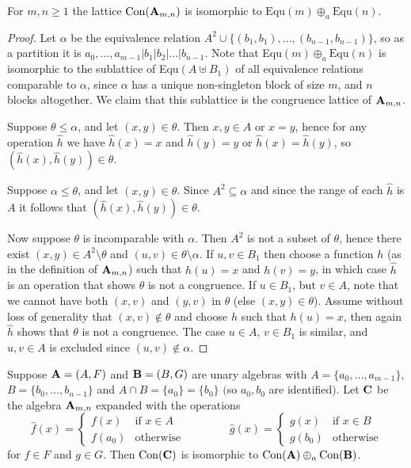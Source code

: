 \begin{lemma}
  For $m,n\ge 1$ the lattice $\mathrm{Con}(\mathbf A_{m,n})$ is isomorphic to
  $\mathrm{Equ}(m)\oplus_a \mathrm{Equ}(n)$. 
\end{lemma}
\begin{proof}
  Let $\alpha$ be the equivalence relation
  $A^2\cup\{(b_1,b_1),\dots,(b_{n-1},b_{n-1})\}$, so as a partition it is  
  $a_0,\dots,a_{m-1}|b_1|b_2|\dots|b_{n-1}$. 
  Note that Equ$(m)\oplus_a \text{Equ}(n)$ is isomorphic to the sublattice
  of Equ$(A\uplus B_1)$ of all equivalence relations comparable to $\alpha$, since
  $\alpha$ has a unique non-singleton block of size $m$, and $n$ blocks
  altogether. We claim that this sublattice is the congruence lattice of $\mathbf
  A_{m,n}$.  

  Suppose $\theta\le\alpha$, and let $(x,y)\in\theta$. Then $x,y\in A$ or $x=y$,
  hence for any operation $\hat h$ we  have $\hat h(x)=x$ and $\hat h(y)=y$ or
  $\hat h(x)=\hat h(y)$, so $(\hat h(x),\hat h(y))\in\theta$. 

  Suppose $\alpha\le\theta$, and let $(x,y)\in\theta$. Since $A^2\subseteq\alpha$
  and since the range of each $\hat h$ is $A$ it follows that 
  $(\hat h(x),\hat h(y))\in\theta$. 

  Now suppose $\theta$ is incomparable with $\alpha$. Then $A^2$ is not a subset
  of $\theta$, hence there exist $(x,y)\in A^2\setminus\theta$ and
  $(u,v)\in\theta\setminus\alpha$. If $u,v\in B_1$ then choose a function $h$ (as
  in the definition of $\mathbf A_{m,n}$) such that $h(u)=x$ and $h(v)=y$, in which
  case $\hat h$ is an operation that shows $\theta$ is not a congruence. 
  If $u\in B_1$, but $v\in A$, note that we cannot have both $(x,v)$ and $(y,v)$
  in $\theta$ (else $(x,y)\in\theta$). Assume without loss of generality 
  that $(x,v)\notin\theta$ and choose $h$ such that $h(u)=x$, then again $\hat h$
  shows that $\theta$ is not a congruence. 
  The case $u\in A$, $v\in B_1$ is similar, and $u,v\in A$ is excluded since
  $(u,v)\notin\alpha$. 
\end{proof}


\begin{theorem}
  Suppose $\mathbf A=(A,F)$ and $\mathbf B=(B,G)$ are unary algebras with
  $A=\{a_0,\dots,a_{m-1}\}$, $B=\{b_0,\dots,b_{n-1}\}$ and 
  $A\cap B=\{a_0\}=\{b_0\}$ $($so $a_0,b_0$ are identified$)$. Let $\mathbf C$ be the
  algebra $\mathbf A_{m,n}$ expanded with the operations 
  $$
  \hat f(x)=\begin{cases}f(x)&\text{if $x\in A$}\\
  f(a_0)&\text{otherwise}\end{cases}\qquad\qquad
  \hat g(x)=\begin{cases}g(x)&\text{if $x\in B$}\\
  g(b_0)&\text{otherwise}\end{cases}
  $$
  for $f\in F$ and $g\in G$. Then $\mathrm{Con}(\mathbf C)$ is isomorphic to
  $\mathrm{Con}(\mathbf A)\oplus_a\mathrm{Con}(\mathbf B)$. 
\end{theorem}

